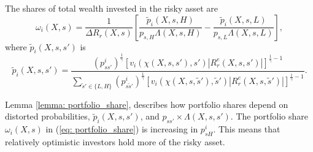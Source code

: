 \begin{lemma}\label{lemma: portfolio_share} The
shares of total wealth invested in the risky asset are 
\begin{equation}
\omega_{i}(X,s)=\frac{1}{\Delta R_{r}(X,s)}\left[\frac{\tilde{p}_{i}(X,s,H)}{p_{s,H}\Lambda(X,s,H)}-\frac{\tilde{p}_{i}(X,s,L)}{p_{s,L}\Lambda(X,s,L)}\right],\label{eq: portfolio_share}
\end{equation}
where $\tilde{p}_{i}(X,s,s')$ is 
\[
\tilde{p}_{i}(X,s,s')=\frac{(p_{ss'}^{i})^{\frac{1}{\gamma}}\left[v_{i}(\chi(X,s,s'),s')|R_{r}^{e}(X,s,s')|\right]^{\frac{1}{\gamma}-1}}{\sum_{\tilde{s}'\in\{L,H\}}(p_{s\tilde{s}'}^{i})^{\frac{1}{\gamma}}\left[v_{i}(\chi(X,s,\tilde{s}'),\tilde{s}')|R_{r}^{e}(X,s,\tilde{s}')|\right]^{\frac{1}{\gamma}-1}}.
\]
\end{lemma}
Lemma \ref{lemma: portfolio_share}, describes how portfolio shares
depend on distorted probabilities, $\tilde{p}_{i}(X,s,s')$, and
$p_{ss'}\times\Lambda(X,s,s')$. 
The portfolio share $\omega_{i}(X,s)$ in (\ref{eq: portfolio_share}) is increasing in $p_{sH}^{i}$. 
This means that relatively optimistic investors hold more of the risky asset. 

